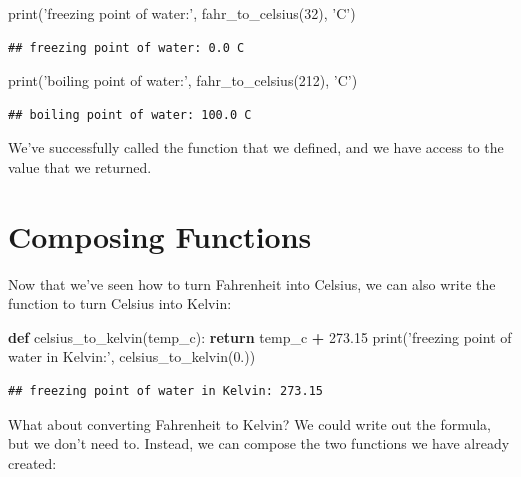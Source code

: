 \documentclass[]{book}
\newenvironment{Shaded}{\begin{snugshade}}{\end{snugshade}}
\newcommand{\BuiltInTok}[1]{#1}
\newcommand{\ControlFlowTok}[1]{\textcolor[rgb]{0.13,0.29,0.53}{\textbf{#1}}}
\newcommand{\DecValTok}[1]{\textcolor[rgb]{0.00,0.00,0.81}{#1}}
\newcommand{\FloatTok}[1]{\textcolor[rgb]{0.00,0.00,0.81}{#1}}
\newcommand{\KeywordTok}[1]{\textcolor[rgb]{0.13,0.29,0.53}{\textbf{#1}}}
\newcommand{\NormalTok}[1]{#1}
\newcommand{\OperatorTok}[1]{\textcolor[rgb]{0.81,0.36,0.00}{\textbf{#1}}}
\newcommand{\StringTok}[1]{\textcolor[rgb]{0.31,0.60,0.02}{#1}}
\theoremstyle{definition}
\theoremstyle{definition}
\theoremstyle{definition}
\theoremstyle{remark}
\begin{document}
\begin{Shaded}
\begin{Highlighting}[]
\BuiltInTok{print}\NormalTok{(}\StringTok{'freezing point of water:'}\NormalTok{, fahr_to_celsius(}\DecValTok{32}\NormalTok{), }\StringTok{'C'}\NormalTok{)}
\end{Highlighting}
\end{Shaded}

\begin{verbatim}
## freezing point of water: 0.0 C
\end{verbatim}

\begin{Shaded}
\begin{Highlighting}[]
\BuiltInTok{print}\NormalTok{(}\StringTok{'boiling point of water:'}\NormalTok{, fahr_to_celsius(}\DecValTok{212}\NormalTok{), }\StringTok{'C'}\NormalTok{)}
\end{Highlighting}
\end{Shaded}

\begin{verbatim}
## boiling point of water: 100.0 C
\end{verbatim}

We've successfully called the function that we defined, and we have
access to the value that we returned.

\hypertarget{composing-functions}{%
\section{Composing Functions}\label{composing-functions}}

Now that we've seen how to turn Fahrenheit into Celsius, we can also
write the function to turn Celsius into Kelvin:

\begin{Shaded}
\begin{Highlighting}[]
\KeywordTok{def}\NormalTok{ celsius_to_kelvin(temp_c):}
    \ControlFlowTok{return}\NormalTok{ temp_c }\OperatorTok{+} \FloatTok{273.15}
\BuiltInTok{print}\NormalTok{(}\StringTok{'freezing point of water in Kelvin:'}\NormalTok{, celsius_to_kelvin(}\FloatTok{0.}\NormalTok{))}
\end{Highlighting}
\end{Shaded}

\begin{verbatim}
## freezing point of water in Kelvin: 273.15
\end{verbatim}

What about converting Fahrenheit to Kelvin? We could write out the
formula, but we don't need to. Instead, we can compose the two functions
we have already created:
\end{document}
